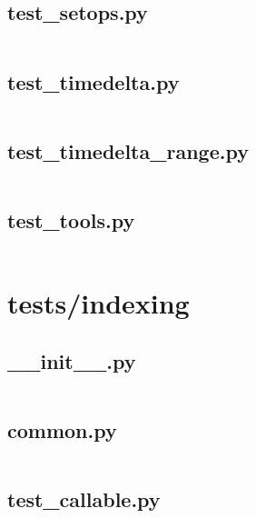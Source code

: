 \documentclass{article}
\begin{document}
\subsection{test\_setops.py}
\inputminted{python}{/home/dufferzafar/dev/@clones/pandas/pandas/tests/indexes/timedeltas/test_setops.py}
\newpage

\subsection{test\_timedelta.py}
\inputminted{python}{/home/dufferzafar/dev/@clones/pandas/pandas/tests/indexes/timedeltas/test_timedelta.py}
\newpage

\subsection{test\_timedelta\_range.py}
\inputminted{python}{/home/dufferzafar/dev/@clones/pandas/pandas/tests/indexes/timedeltas/test_timedelta_range.py}
\newpage

\subsection{test\_tools.py}
\inputminted{python}{/home/dufferzafar/dev/@clones/pandas/pandas/tests/indexes/timedeltas/test_tools.py}
\newpage

\section{tests/indexing}

\subsection{\_\_init\_\_.py}
\inputminted{python}{/home/dufferzafar/dev/@clones/pandas/pandas/tests/indexing/__init__.py}
\newpage

\subsection{common.py}
\inputminted{python}{/home/dufferzafar/dev/@clones/pandas/pandas/tests/indexing/common.py}
\newpage

\subsection{test\_callable.py}
\inputminted{python}{/home/dufferzafar/dev/@clones/pandas/pandas/tests/indexing/test_callable.py}
\newpage
\end{document}
